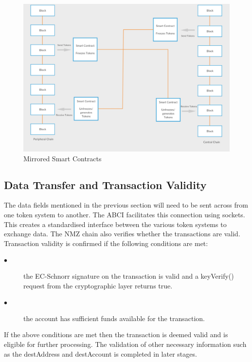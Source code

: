 \documentclass[a4paper,twoside,phd]{BYUPhys}
\begin{document}
\begin{figure} 
  \includegraphics[width=\linewidth]{mirrored_blockchains.png}
  \caption{Mirrored Smart Contracts}
  \label{fig:smart}
\end{figure}

\subsection{Data Transfer and Transaction Validity}
The data fields mentioned in the previous section will need to be sent across from one token system to another. The ABCI facilitates this connection using sockets. This creates a standardised interface between the various token systems to exchange data. The NMZ chain also verifies whether the transactions are valid. Transaction validity is confirmed if the following conditions are met:
\begin{description}
\item[$\bullet$]the EC-Schnorr signature on the transaction is valid and a keyVerify() request from the cryptographic layer returns true.
\item[$\bullet$]the account has sufficient funds available for the transaction.
\end{description}

If the above conditions are met then the transaction is deemed valid and is eligible for further processing. The validation of other necessary information such as the destAddress and destAccount is completed in later stages. 
\end{document}
